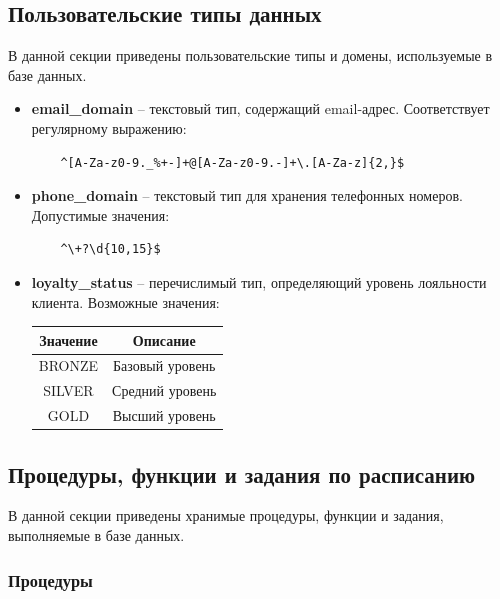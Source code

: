 \documentclass[a4paper,12pt]{article}
\begin{document}
    \subsection{Пользовательские типы данных}

    В данной секции приведены пользовательские типы и домены, используемые в базе данных.

    \begin{itemize}
        \item \textbf{email\_domain} – текстовый тип, содержащий email-адрес. Соответствует регулярному выражению:
        \begin{verbatim}
    ^[A-Za-z0-9._%+-]+@[A-Za-z0-9.-]+\.[A-Za-z]{2,}$
        \end{verbatim}

        \item \textbf{phone\_domain} – текстовый тип для хранения телефонных номеров. Допустимые значения:
        \begin{verbatim}
    ^\+?\d{10,15}$
        \end{verbatim}

        \item \textbf{loyalty\_status} – перечислимый тип, определяющий уровень лояльности клиента. Возможные значения:
        \begin{center}
            \begin{tabular}{|c|c|}
                \hline
                Значение & Описание        \\
                \hline
                BRONZE   & Базовый уровень \\
                SILVER   & Средний уровень \\
                GOLD     & Высший уровень  \\
                \hline
            \end{tabular}
        \end{center}
    \end{itemize}

    \subsection{Процедуры, функции и задания по расписанию}

    В данной секции приведены хранимые процедуры, функции и задания, выполняемые в базе данных.

    \subsubsection{Процедуры}
\end{document}

